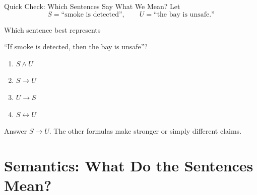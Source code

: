 \documentclass[aspectratio=169,10pt]{beamer}
\begin{document}
\begin{frame}[shrink=8]{Quick Check: Which Sentences Say What We Mean?}
  Let
  \[
    S=\text{``smoke is detected''},\qquad U=\text{``the bay is unsafe.''}
  \]

  Which sentence best represents
  \begin{center}
    ``If smoke is detected, then the bay is unsafe''?
  \end{center}

  \begin{enumerate}
    \item $S\land U$
    \item $S\rightarrow U$
    \item $U\rightarrow S$
    \item $S\leftrightarrow U$
  \end{enumerate}

  \begin{block}{Answer}
    \(S\rightarrow U\). The other formulas make stronger or simply different claims.
  \end{block}
\end{frame}

\section{Semantics: What Do the Sentences Mean?}
\end{document}
